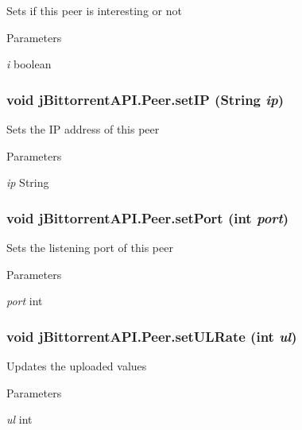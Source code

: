 \label{classj_bittorrent_a_p_i_1_1_peer_afd6499773360e27d3c87c3a392014c46}
Sets if this peer is interesting or not 
\begin{DoxyParams}{Parameters}
\item[{\em i}]boolean \end{DoxyParams}
\hypertarget{classj_bittorrent_a_p_i_1_1_peer_a765f94ac876c1de0d22ec44cbadaa5ef}{
\subsubsection[{setIP}]{\setlength{\rightskip}{0pt plus 5cm}void jBittorrentAPI.Peer.setIP (String {\em ip})}}
\label{classj_bittorrent_a_p_i_1_1_peer_a765f94ac876c1de0d22ec44cbadaa5ef}
Sets the IP address of this peer 
\begin{DoxyParams}{Parameters}
\item[{\em ip}]String \end{DoxyParams}
\hypertarget{classj_bittorrent_a_p_i_1_1_peer_ac15e5b181addfb991805605b9549859f}{
\subsubsection[{setPort}]{\setlength{\rightskip}{0pt plus 5cm}void jBittorrentAPI.Peer.setPort (int {\em port})}}
\label{classj_bittorrent_a_p_i_1_1_peer_ac15e5b181addfb991805605b9549859f}
Sets the listening port of this peer 
\begin{DoxyParams}{Parameters}
\item[{\em port}]int \end{DoxyParams}
\hypertarget{classj_bittorrent_a_p_i_1_1_peer_af0348eb2b8fb4cffa99f96777ea8d7cb}{
\subsubsection[{setULRate}]{\setlength{\rightskip}{0pt plus 5cm}void jBittorrentAPI.Peer.setULRate (int {\em ul})}}
\label{classj_bittorrent_a_p_i_1_1_peer_af0348eb2b8fb4cffa99f96777ea8d7cb}
Updates the uploaded values 
\begin{DoxyParams}{Parameters}
\item[{\em ul}]int \end{DoxyParams}
